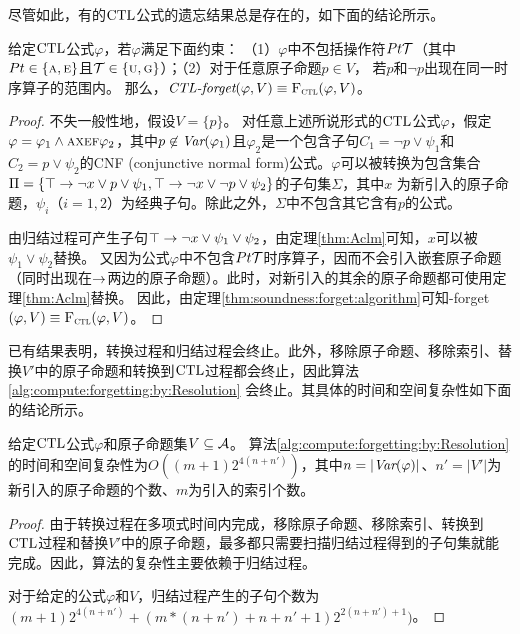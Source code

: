尽管如此，有的$\textrm{CTL}$公式的遗忘结果总是存在的，如下面的结论所示。
\begin{proposition} \label{pro:fogCTL}
	给定$\textrm{CTL}$公式$\varphi$，若$\varphi$满足下面约束：
	（1）$\varphi$中不包括操作符$Pt {\cal T}$（其中$Pt \in \{\textsc{a}, \textsc{e}\}$且${\cal T} \in \{\textsc{u}, \textsc{g}\}$）；（2）对于任意原子命题$p\in V$， 若$p$和$\neg p$出现在同一时序算子的范围内。
	那么，$\emph{CTL-forget}(\varphi,V) \equiv {\textsc{F}_{\textsc{ctl}}}(\varphi, V)$。
\end{proposition}
\begin{proof}
	不失一般性地，假设$V = \{p\}$。
	对任意上述所说形式的$\textrm{CTL}$公式$\varphi$，假定$\varphi = \varphi_1 \wedge \textsc{a} \textsc{x} \textsc{e} \textsc{f} \varphi_2$，其中$p\not \in \textit{Var}(\varphi_1)$且$\varphi_2$是一个包含子句$C_1 = \neg p \vee \psi_1$和$C_2 = p \vee \psi_2$的CNF (conjunctive normal form)公式。$\varphi$可以被转换为包含集合$\Pi = \{\top \rightarrow \neg x \vee p \vee  \psi_1,  \top \rightarrow \neg x \vee \neg p \vee \psi_2\}$的子句集$\Sigma$，其中$x$ 为新引入的原子命题，$\psi_i$（$i=1,2$）为经典子句。除此之外，$\Sigma$中不包含其它含有$p$的公式。
	
	由归结过程可产生子句$\top \rightarrow \neg x \vee \psi_1 \vee \psi_2$，由定理\ref{thm:Aclm}可知，$x$可以被$\psi_1 \vee \psi_2$替换。
	又因为公式$\varphi$中不包含$Pt {\cal T}$时序算子，因而不会引入嵌套原子命题（同时出现在$\rightarrow$两边的原子命题）。此时，对新引入的其余的原子命题都可使用定理\ref{thm:Aclm}替换。
	因此，由定理\ref{thm:soundness:forget:algorithm}可知\CTL-forget$(\varphi,V)\equiv {\textsc{F}_{\textsc{ctl}}}(\varphi, V)$。
\end{proof}




\label{chp4:sect:complex}
已有结果表明，转换过程和归结过程会终止\cite{zhang2014resolution}。此外，移除原子命题、移除索引、替换$V'$中的原子命题和转换到$\textrm{CTL}$过程都会终止，因此算法\ref{alg:compute:forgetting:by:Resolution} 会终止。其具体的时间和空间复杂性如下面的结论所示。


\begin{proposition}\label{pro:complexity}
	给定$\textrm{CTL}$公式$\varphi$和原子命题集$V \subseteq {\cal A}$。
	算法\ref{alg:compute:forgetting:by:Resolution} 的时间和空间复杂性为$O((m+1)2^{4(n+n')})$，其中$n=|\textit{Var}(\varphi)|$、$n'=|V'|$为新引入的原子命题的个数、$m$为引入的索引个数。
\end{proposition}
\begin{proof}
	由于转换过程在多项式时间内完成，移除原子命题、移除索引、转换到$\textrm{CTL}$过程和替换$V'$中的原子命题，最多都只需要扫描归结过程得到的子句集就能完成。因此，算法的复杂性主要依赖于归结过程。
	
	对于给定的公式$\varphi$和$V$，归结过程产生的子句个数为$(m+1)2^{4(n+n')}+(m*(n+n')+n+n'+1)2^{2(n+n')+1})$。
\end{proof}

